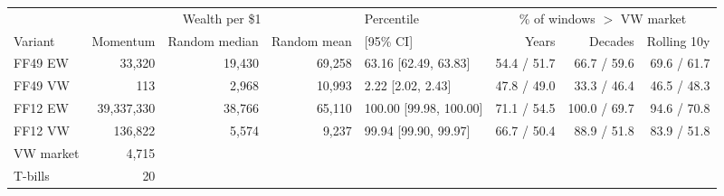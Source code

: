 \begin{tabular}{@{}lrrrlrrr@{}}
\toprule
& \multicolumn{3}{c}{Wealth per \$1} & Percentile & \multicolumn{3}{c}{\% of windows $>$ VW market} \\
\cmidrule(lr){2-4} \cmidrule(l){6-8}
Variant & Momentum & Random median & Random mean & [95\% CI] & Years & Decades & Rolling 10y \\ \midrule
FF49 EW & 33,320 & 19,430 & 69,258 & 63.16 [62.49, 63.83] & 54.4 / 51.7 & 66.7 / 59.6 & 69.6 / 61.7 \\
FF49 VW & 113 & 2,968 & 10,993 & 2.22 [2.02, 2.43] & 47.8 / 49.0 & 33.3 / 46.4 & 46.5 / 48.3 \\
FF12 EW & 39,337,330 & 38,766 & 65,110 & 100.00 [99.98, 100.00] & 71.1 / 54.5 & 100.0 / 69.7 & 94.6 / 70.8 \\
FF12 VW & 136,822 & 5,574 & 9,237 & 99.94 [99.90, 99.97] & 66.7 / 50.4 & 88.9 / 51.8 & 83.9 / 51.8 \\
\midrule
VW market & 4,715 & & & & & & \\
T-bills & 20 & & & & & & \\
\bottomrule
\end{tabular}
